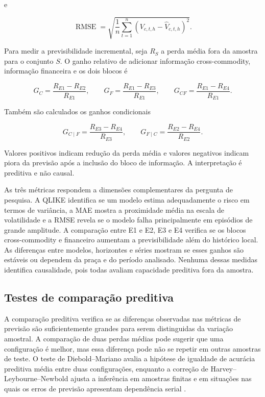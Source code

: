 \documentclass[a4paper,fleqn]{cas-sc}
\begin{document}
e

\begin{equation}
\operatorname{RMSE}
=
\sqrt{
\frac{1}{n}\sum_{t=1}^{n}
\left(V_{c,t,h}-\widehat{V}_{c,t,h}\right)^{2}
}.
\label{eq:rmse}
\end{equation}

Para medir a previsibilidade incremental, seja \(R_S\) a perda média fora da amostra para o conjunto \(S\). O ganho relativo de adicionar informação cross-commodity, informação financeira e os dois blocos é

\begin{equation}
G_C=\frac{R_{E1}-R_{E2}}{R_{E1}},
\qquad
G_F=\frac{R_{E1}-R_{E3}}{R_{E1}},
\qquad
G_{CF}=\frac{R_{E1}-R_{E4}}{R_{E1}}.
\label{eq:incremental_gain}
\end{equation}

Também são calculados os ganhos condicionais

\begin{equation}
G_{C\mid F}=\frac{R_{E3}-R_{E4}}{R_{E3}},
\qquad
G_{F\mid C}=\frac{R_{E2}-R_{E4}}{R_{E2}}.
\label{eq:conditional_gain}
\end{equation}

Valores positivos indicam redução da perda média e valores negativos indicam piora da previsão após a inclusão do bloco de informação. A interpretação é preditiva e não causal.

As três métricas respondem a dimensões complementares da pergunta de pesquisa. A QLIKE identifica se um modelo estima adequadamente o risco em termos de variância, a MAE mostra a proximidade média na escala de volatilidade e a RMSE revela se o modelo falha principalmente em episódios de grande amplitude. A comparação entre E1 e E2, E3 e E4 verifica se os blocos cross-commodity e financeiro aumentam a previsibilidade além do histórico local. As diferenças entre modelos, horizontes e séries mostram se esses ganhos são estáveis ou dependem da praça e do período analisado. Nenhuma dessas medidas identifica causalidade, pois todas avaliam capacidade preditiva fora da amostra.

\subsection{Testes de comparação preditiva}
\label{subsec:dm_test}

A comparação preditiva verifica se as diferenças observadas nas métricas de previsão são suficientemente grandes para serem distinguidas da variação amostral. A comparação de duas perdas médias pode sugerir que uma configuração é melhor, mas essa diferença pode não se repetir em outras amostras de teste. O teste de Diebold--Mariano avalia a hipótese de igualdade de acurácia preditiva média entre duas configurações, enquanto a correção de Harvey--Leybourne--Newbold ajusta a inferência em amostras finitas e em situações nas quais os erros de previsão apresentam dependência serial \citep{DieboldMariano1995,HarveyLeybourneNewbold1997}.
\end{document}
